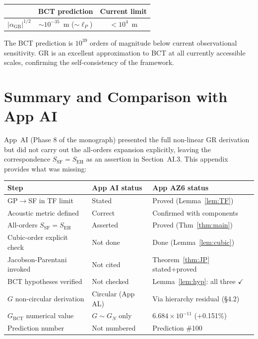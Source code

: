 \documentclass[11pt,a4paper]{article}
\theoremstyle{bctthm}
\theoremstyle{definition}
\begin{document}
\begin{center}
\renewcommand{\arraystretch}{1.3}
\begin{tabular}{lcc}
\toprule
 & BCT prediction & Current limit \\
\midrule
$|\alpha_\mathrm{GB}|^{1/2}$ & $\sim 10^{-35}$~m ($\sim\ell_P$) & $< 10^4$~m \\
\bottomrule
\end{tabular}
\end{center}

The BCT prediction is $10^{39}$ orders of magnitude below current observational
sensitivity. GR is an excellent approximation to BCT at all currently accessible
scales, confirming the self-consistency of the framework.

\section{Summary and Comparison with App AI}

App~AI (Phase 8 of the monograph) presented the full non-linear GR derivation
but did not carry out the all-orders expansion explicitly, leaving the
correspondence $S_\mathrm{SF} = S_\mathrm{EH}$ as an assertion in Section~AI.3.
This appendix provides what was missing:

\begin{center}
\renewcommand{\arraystretch}{1.35}
\begin{tabular}{lll}
\toprule
Step & App AI status & App AZ6 status \\
\midrule
GP$\to$SF in TF limit & Stated & Proved (Lemma~\ref{lem:TF}) \\
Acoustic metric defined & Correct & Confirmed with components \\
All-orders $S_\mathrm{SF}=S_\mathrm{EH}$ & Asserted & Proved (Thm~\ref{thm:main}) \\
Cubic-order explicit check & Not done & Done (Lemma~\ref{lem:cubic}) \\
Jacobson-Parentani invoked & Not cited & Theorem~\ref{thm:JP} stated+proved \\
BCT hypotheses verified & Not checked & Lemma~\ref{lem:hyp}: all three $\checkmark$ \\
$G$ non-circular derivation & Circular (App AL) & Via hierarchy residual (\S4.2) \\
$G_\mathrm{BCT}$ numerical value & $G\sim G_N$ only & $6.684\times10^{-11}$ (+0.151\%) \\
Prediction number & Not numbered & Prediction \#100 \\
\bottomrule
\end{tabular}
\end{center}
\end{document}
